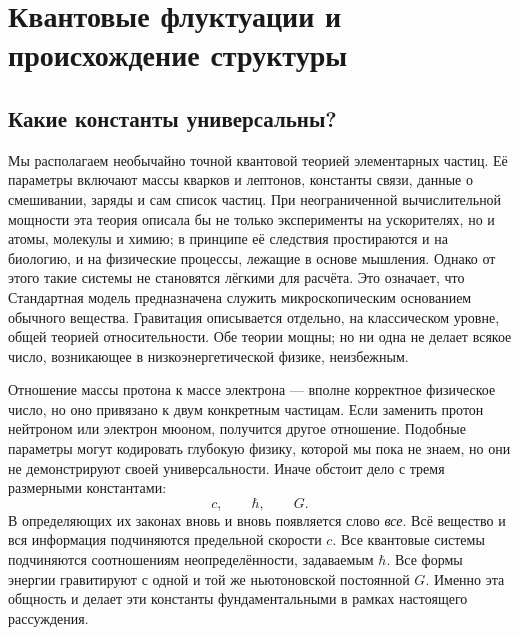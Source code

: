 \chapter{Квантовые флуктуации и происхождение структуры}


\section{Какие константы универсальны?}

Мы располагаем необычайно точной квантовой теорией элементарных частиц. Её параметры включают массы кварков и лептонов, константы связи, данные о смешивании, заряды и сам список частиц. При неограниченной вычислительной мощности эта теория описала бы не только эксперименты на ускорителях, но и атомы, молекулы и химию; в принципе её следствия простираются и на биологию, и на физические процессы, лежащие в основе мышления. Однако от этого такие системы не становятся лёгкими для расчёта. Это означает, что Стандартная модель предназначена служить микроскопическим основанием обычного вещества. Гравитация описывается отдельно, на классическом уровне, общей теорией относительности. Обе теории мощны; но ни одна не делает всякое число, возникающее в низкоэнергетической физике, неизбежным.

Отношение массы протона к массе электрона — вполне корректное физическое число, но оно привязано к двум конкретным частицам. Если заменить протон нейтроном или электрон мюоном, получится другое отношение. Подобные параметры могут кодировать глубокую физику, которой мы пока не знаем, но они не демонстрируют своей универсальности. Иначе обстоит дело с тремя размерными константами:
\[
c,\qquad \hbar,\qquad G.
\]
В определяющих их законах вновь и вновь появляется слово \emph{все}. Всё вещество и вся информация подчиняются предельной скорости \(c\). Все квантовые системы подчиняются соотношениям неопределённости, задаваемым \(\hbar\). Все формы энергии гравитируют с одной и той же ньютоновской постоянной \(G\). Именно эта общность и делает эти константы фундаментальными в рамках настоящего рассуждения.

